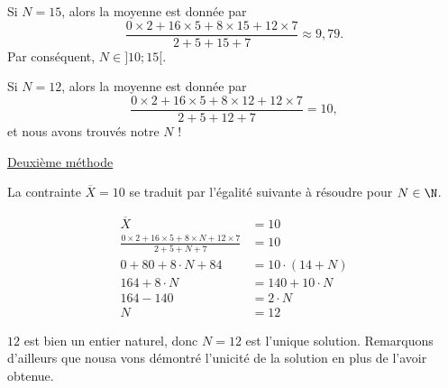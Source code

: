 {	Si $N=15$, alors la moyenne est donnée par
		\[ \frac{0\times2+16\times5+8\times15+12\times7}{2+5+15+7} \approx 9,79. \]
	Par conséquent, $N \in ]10 ; 15[$.
	
	Si $N=12$, alors la moyenne est donnée par
		\[ \frac{0\times2+16\times5+8\times12+12\times7}{2+5+12+7} = 10, \]
	et nous avons trouvés notre $N$ !

	\underline{Deuxième méthode}

	La contrainte $\overline{X} = 10$ se traduit par l'égalité suivante à résoudre pour $N\in\N$.
	
		\begin{align*}
			\overline{X} &= 10 \\
			\frac{0\times2+16\times5+8\times N+12\times7}{2+5+N+7} &= 10 \\
			0  + 80 + 8\cdot N + 84 &= 10 \cdot(14 + N) \\
			164 + 8 \cdot N &= 140 + 10 \cdot N \\
			164-140 &= 2 \cdot N \\
			N &= 12		
		\end{align*}

	$12$ est bien un entier naturel, donc $N=12$ est l'unique solution.
	Remarquons d'ailleurs que nousa vons démontré l'unicité de la solution en plus de l'avoir obtenue.
}

%	
%	
%
%	



